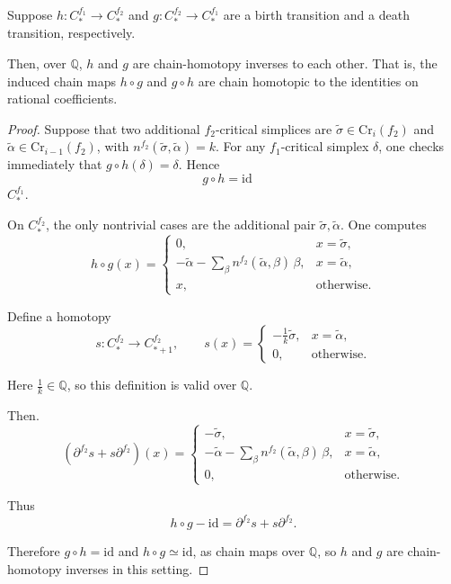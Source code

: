 \documentclass[10pt,a4paper]{amsart}
\begin{document}
\begin{theorem}

Suppose $h:C_\ast^{f_1} \to C_\ast^{f_2}$ and 
$g:C_\ast^{f_2} \to C_\ast^{f_1}$ are a birth transition and 
a death transition, respectively. 

Then, over $\mathbb{Q}$, 
$h$ and $g$ are chain-homotopy inverses to each other. 
That is, the induced chain maps
$h\circ g$ and  $g\circ h$
are chain homotopic to the
identities on rational coefficients.

\end{theorem}

\begin{proof}
Suppose that two additional $f_2$-critical simplices are 
$\tilde{\sigma} \in \mathrm{Cr}_i(f_2)$ 
and $\tilde{\alpha} \in \mathrm{Cr}_{i-1}(f_2)$,
with $n^{f_2}(\tilde{\sigma}, \tilde{\alpha})=k$.
For any $f_1$-critical simplex $\delta$, one checks immediately that 
$g\circ h(\delta)=\delta$. Hence 
\[ g\circ h = \mathrm{id} \quad\]
  $C^{f_1}_\ast .$ 

On $C^{f_2}_\ast$, the only nontrivial cases are the additional pair 
$\tilde{\sigma},\tilde{\alpha}$. One computes
\[
h\circ g(x) = 
\begin{cases}
0, & x=\tilde{\sigma},\\[6pt]
-\tilde{\alpha}-\sum\limits_{\beta} n^{f_2}(\tilde{\alpha},\beta)\,\beta, & x=\tilde{\alpha},\\[10pt]
x, & \text{otherwise}.
\end{cases}
\]

Define a homotopy
\[
s: C^{f_2}_\ast \to C^{f_2}_{\ast+1}, 
\qquad
s(x) = 
\begin{cases}
-\tfrac{1}{k}\tilde{\sigma}, & x=\tilde{\alpha},\\[6pt]
0, & \text{otherwise}.
\end{cases}
\]

Here $\tfrac{1}{k}\in \mathbb{Q}$, so this definition is valid over
$\mathbb{Q}.$

Then.
\[
(\partial^{f_2}s+s\partial^{f_2})(x) = 
\begin{cases}
-\tilde{\sigma}, & x=\tilde{\sigma},\\[6pt]
-\tilde{\alpha}-\sum\limits_{\beta} n^{f_2}(\tilde{\alpha},\beta)\,\beta, & x=\tilde{\alpha},\\[10pt]
0, & \text{otherwise}.
\end{cases}
\]

Thus
\[
h\circ g - \mathrm{id} = \partial^{f_2}s+s\partial^{f_2}.
\]

Therefore $g\circ h=\mathrm{id}$ and $h\circ g\simeq \mathrm{id}$, 
as chain maps over $\mathbb{Q}$, so $h$ and $g$ are chain-homotopy inverses in this setting.

\end{proof}
\end{document}
